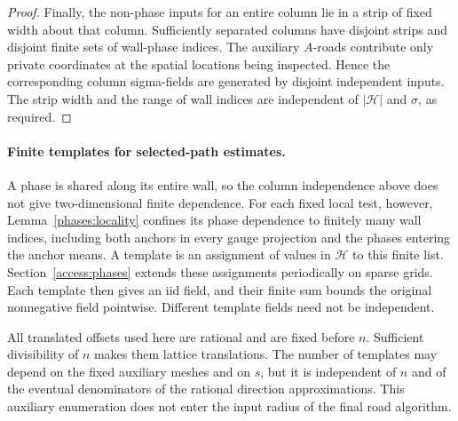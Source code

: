 \begin{proof}
Finally, the non-phase inputs for an entire column lie in a strip of
fixed width about that column.  Sufficiently separated columns have
disjoint strips and disjoint finite sets of wall-phase indices.  The
auxiliary $A$-roads contribute only private coordinates at the spatial
locations being inspected.  Hence the corresponding column
sigma-fields are generated by disjoint independent inputs.  The strip
width and the range of wall indices are independent of
$|\mathcal H|$ and $\sigma$, as required.
\end{proof}

\paragraph{Finite templates for selected-path estimates.}
A phase is shared along its entire wall, so the column independence
above does not give two-dimensional finite dependence. For each fixed
local test, however, Lemma~\ref{phases:locality} confines its phase
dependence to finitely many wall indices, including both anchors in
every gauge projection and the phases entering the anchor means.
A template is an assignment of values in $\mathcal H$ to this finite
list. Section~\ref{access:phases} extends these assignments periodically
on sparse grids. Each template then gives an iid field, and their
finite sum bounds the original nonnegative field pointwise. Different
template fields need not be independent.

All translated offsets used here are rational and are fixed before
$n$.  Sufficient divisibility of $n$ makes them lattice translations.
The number of templates may depend on the fixed auxiliary meshes and
on $s$, but it is independent of $n$ and of the eventual denominators
of the rational direction approximations.  This auxiliary enumeration
does not enter the input radius of the final road algorithm.
